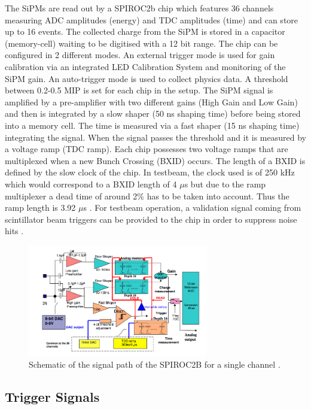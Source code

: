 \documentclass[twoside,a4paper,11pt]{article}
\begin{document}
The SiPMs are read out by a SPIROC2b chip which features 36 channels measuring ADC amplitudes (energy) and TDC amplitudes (time) and can store up to 16 events. The collected charge from the SiPM is stored in a capacitor (memory-cell) waiting to be digitised with a 12 bit range. The chip can be configured in 2 different modes. An external trigger mode is used for gain calibration via an integrated LED Calibration System and monitoring of the SiPM gain. An auto-trigger mode is used to collect physics data. A threshold between 0.2-0.5 MIP is set for each chip in the setup. The SiPM signal is amplified by a pre-amplifier with two different gains (High Gain and Low Gain) and then is integrated by a slow shaper (50 ns shaping time) before being stored into a memory cell. The time is measured via a fast shaper (15 ns shaping time) integrating the signal. When the signal passes the threshold and it is measured by a voltage ramp (TDC ramp). Each chip possesses two voltage ramps that are multiplexed when a new Bunch Crossing (BXID) occurs. The length of a BXID is defined by the slow clock of the chip. In testbeam, the clock used is of 250 kHz which would correspond to a BXID length of 4 $\mu$s but due to the ramp multiplexer a dead time of around 2\% has to be taken into account. Thus the ramp length is 3.92 $\mu$s \cite{EldwanSSP}. For testbeam operation, a validation signal coming from scintillator beam triggers can be provided to the chip in order to suppress noise hits \cite{DAQ}.\\
\begin{figure}[htbp]
\begin{center}
\includegraphics[width=0.7\textwidth]{fig/Others/Spiroc_layout.png}
\caption{Schematic of the signal path of the SPIROC2B for a single channel \cite{SPIROCManual}.}
\label{fig:SPIROC2B}
\end{center}
\end{figure}

\subsection{Trigger Signals}
\label{subsec:trigger}
\end{document}
